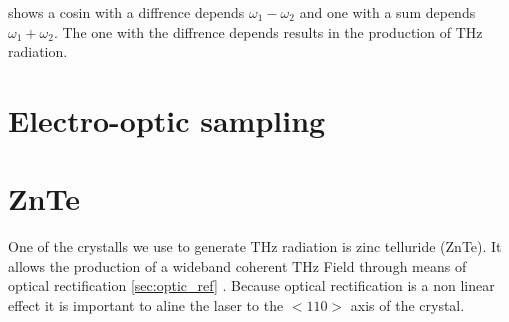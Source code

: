 shows a cosin with a diffrence depends $\omega_1-\omega_2$ and one with a sum depends $\omega_1+\omega_2$.
The one with the diffrence depends results in the production of $\si{\tera\hertz}$ radiation.

\cite[289--291]{book_optical_rectification}

\section{Electro-optic sampling}\label{sec:eos}


\section{ZnTe}
One of the crystalls we use to generate $\si{\tera\hertz}$ radiation is zinc telluride (ZnTe). 
It allows the production of a wideband coherent $\si{\tera\hertz}$ Field through means of optical rectification \ref{sec:optic_ref} \cite{ZnTe_Nahata_Weling_1996}.
Because optical rectification is a non linear effect it is important to aline the laser to the $<110>$ axis of the crystal.


